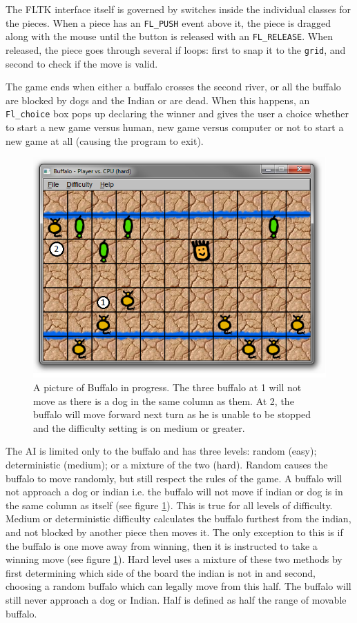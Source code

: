 \documentclass{UoBnote}
\begin{document}
The FLTK interface itself is governed by switches inside the individual classes for the pieces. When a piece has an \verb=FL_PUSH= event above it, the piece is dragged along with the mouse until the button is released with an \verb=FL_RELEASE=. When released, the piece goes through several if loops: first to snap it to the \verb=grid=, and second to check if the move is valid. 

The game ends when either a buffalo crosses the second river, or all the buffalo are blocked by dogs and the Indian or are dead. When this happens, an \verb=Fl_choice= box pops up declaring the winner and gives the user a choice whether to start a new game versus human, new game versus computer or not to start a new game at all (causing the program to exit).

\begin{figure}[htb]
	\begin{center}
		\includegraphics[height=0.4\textheight]{figure2.png}
	\end{center}
	\caption{A picture of Buffalo in progress. The three buffalo at 1 will not move as there is a dog in the same column as them. At 2, the buffalo will move forward next turn as he is unable to be stopped and the difficulty setting is on medium or greater.}
	\label{2}
\end{figure}
The AI is limited only to the buffalo and has three levels: random (easy); deterministic (medium); or a mixture of the two (hard). Random causes the buffalo to move randomly, but still respect the rules of the game. A buffalo will not approach a dog or indian i.e. the buffalo will not move if indian or dog is in the same column as itself (see figure \ref{2}). This is true for all levels of difficulty. Medium or deterministic difficulty calculates the buffalo furthest from the indian, and not blocked by another piece then moves it. The only exception to this is if the buffalo is one move away from winning, then it is instructed to take a winning move (see figure \ref{2}).  Hard level uses a mixture of these two methods by first determining which side of the board the indian is not in and second, choosing a random buffalo which can legally move from this half. The buffalo will still never approach a dog or Indian. Half is defined as half the range of movable buffalo.
\end{document}
